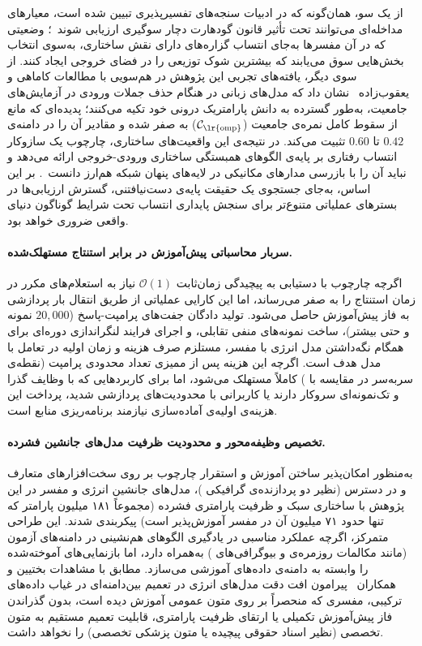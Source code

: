 از یک سو، همان‌گونه که در ادبیات سنجه‌های تفسیرپذیری تبیین شده است، معیارهای مداخله‌ای می‌توانند تحت تأثیر قانون گودهارت دچار سوگیری ارزیابی شوند~\cite{ju2022logictraps, hsia2024goodhart}؛ وضعیتی که در آن مفسرها به‌جای انتساب گزاره‌های دارای نقش ساختاری، به‌سوی انتخاب بخش‌هایی سوق می‌یابند که بیشترین شوک توزیعی را در فضای خروجی ایجاد کنند. از سوی دیگر، یافته‌های تجربی این پژوهش در هم‌سویی با مطالعات کاماهی و یعقوب‌زاده~\cite{kamahi2024counterfactuals} نشان داد که مدل‌های زبانی در هنگام حذف جملات ورودی در آزمایش‌های جامعیت، به‌طور گسترده به دانش پارامتریک درونی خود تکیه می‌کنند؛ پدیده‌ای که مانع از سقوط کامل نمره‌ی جامعیت ($\mathcal{C}_{\text{\lr{omp}}}$) به صفر شده و مقادیر آن را در دامنه‌ی $0.42$ تا $0.60$ تثبیت می‌کند. در نتیجه‌ی این واقعیت‌های ساختاری، چارچوب  یک سازوکار انتساب رفتاری بر پایه‌ی الگوهای همبستگی ساختاری ورودی-خروجی ارائه می‌دهد و نباید آن را با بازرسی مدارهای مکانیکی در لایه‌های پنهان شبکه هم‌ارز دانست~\cite{elhage2021mathematical, friedman2023comparing}. بر این اساس، به‌جای جستجوی یک حقیقت پایه‌ی دست‌نیافتنی، گسترش ارزیابی‌ها در بسترهای عملیاتی متنوع‌تر برای سنجش پایداری انتساب تحت شرایط گوناگون دنیای واقعی ضروری خواهد بود.

\paragraph{سربار محاسباتی پیش‌آموزش در برابر استنتاج مستهلک‌شده.}
اگرچه چارچوب  با دستیابی به پیچیدگی زمان‌ثابت $\mathcal{O}(1)$ نیاز به استعلام‌های مکرر در زمان استنتاج را به صفر می‌رساند، اما این کارایی عملیاتی از طریق انتقال بار پردازشی به فاز پیش‌آموزش حاصل می‌شود. تولید دادگان جفت‌های پرامپت-پاسخ ($20,000$ نمونه و حتی بیشتر)، ساخت نمونه‌های منفی تقابلی، و اجرای فرایند لنگراندازی دوره‌ای برای همگام نگه‌داشتن مدل انرژی با مفسر، مستلزم صرف هزینه و زمان اولیه در تعامل با  مدل هدف است. اگرچه این هزینه پس از ممیزی تعداد محدودی پرامپت (نقطه‌ی سربه‌سر در مقایسه با ) کاملاً مستهلک می‌شود، اما برای کاربردهایی که با وظایف گذرا و تک‌نمونه‌ای سروکار دارند یا کاربرانی با محدودیت‌های پردازشی شدید، پرداخت این هزینه‌ی اولیه‌ی آماده‌سازی نیازمند برنامه‌ریزی منابع است.

\paragraph{تخصیص وظیفه‌محور و محدودیت ظرفیت مدل‌های جانشین فشرده.}
به‌منظور امکان‌پذیر ساختن آموزش و استقرار چارچوب بر روی سخت‌افزارهای متعارف و در دسترس (نظیر دو پردازنده‌ی گرافیکی )، مدل‌های جانشین انرژی و مفسر در این پژوهش با ساختاری سبک و ظرفیت پارامتری فشرده (مجموعاً ۱۸۱ میلیون پارامتر که تنها حدود ۷۱ میلیون آن در مفسر آموزش‌پذیر است) پیکربندی شدند. این طراحی متمرکز، اگرچه عملکرد مناسبی در یادگیری الگوهای هم‌نشینی در دامنه‌های آزمون (مانند مکالمات روزمره‌ی  و بیوگرافی‌های ) به‌همراه دارد، اما بازنمایی‌های آموخته‌شده را وابسته به دامنه‌ی داده‌های آموزشی می‌سازد. مطابق با مشاهدات بختیین و همکاران~\cite{bakhtin2019realfake} پیرامون افت دقت مدل‌های انرژی در تعمیم بین‌دامنه‌ای در غیاب داده‌های ترکیبی، مفسری که منحصراً بر روی متون عمومی آموزش دیده است، بدون گذراندن فاز پیش‌آموزش تکمیلی یا ارتقای ظرفیت پارامتری، قابلیت تعمیم مستقیم به متون تخصصی (نظیر اسناد حقوقی پیچیده یا متون پزشکی تخصصی) را نخواهد داشت.

